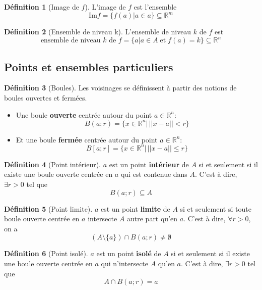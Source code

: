 \documentclass[11pt,a4paper]{article}
\theoremstyle{definition}
\newtheorem{mydef}{Définition}%
\newcommand{\R}{\mathbb{R}}
\begin{document}
\begin{mydef} [Image de $f$] L'image de $f$ est l'ensemble
	\[ \mathrm{Im} f = \{ f(a) | a \in a\} \subseteq \R^m \]
\end{mydef}

\begin{mydef} [Ensemble de niveau k]
	L'ensemble de niveau $k$ de $f$ est
	\[ \text{ensemble de niveau } k\text{ de }f = \{ a | a \in A \;\text{et}\; f(a) = k \} \subseteq \R^n \]
\end{mydef}


\subsection{Points et ensembles particuliers}

\begin{mydef} [Boules] Les voisinages se définissent à partir des notions de boules ouvertes et fermées.
	\begin{itemize}
		\item Une boule \textbf{ouverte} centrée autour du point $a \in \R^n$:
			\[ B(a;r) = \{ x \in \R^n |\,||x-a|| < r \} \]
		\item Et une boule \textbf{fermée} centrée autour du point $a \in \R^n$:
			\[ B[a;r] = \{ x \in \R^n |\,||x-a|| \leq r \} \]
	\end{itemize}
\end{mydef}

\begin{mydef}[Point intérieur]
	$a$ est un point \textbf{intérieur} de $A$ si et seulement si il existe une boule ouverte centrée en $a$ qui est contenue dans $A$.
	C'est à dire, $\exists r > 0$ tel que
	\[ B(a; r) \subseteq A \]
\end{mydef}

\begin{mydef} [Point limite]
	$a$ est un point \textbf{limite} de $A$ si et seulement si toute boule ouverte centrée en $a$ intersecte $A$ autre part qu'en $a$.
	C'est à dire, $\forall r > 0$, on a
	\[ (A \setminus \{a\}) \cap B(a; r) \neq \emptyset \]
\end{mydef}

\begin{mydef} [Point isolé]
	$a$ est un point \textbf{isolé} de $A$ si et seulement si il existe une boule ouverte centrée en $a$ qui n'intersecte $A$ qu'en $a$.
	C'est à dire, $\exists r > 0$ tel que
	\[ A \cap B(a; r) = a \]
\end{mydef}
\end{document}
